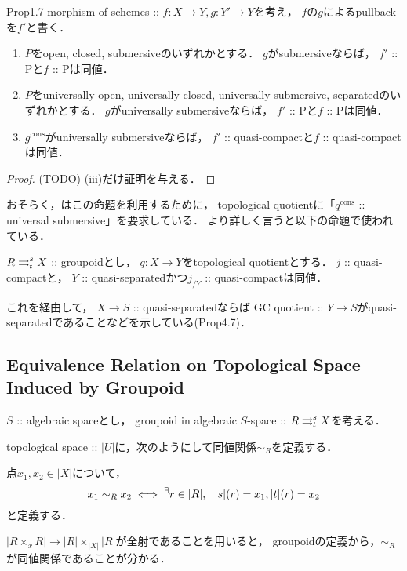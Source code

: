 \documentclass[a4paper, dvipdfmx]{jsarticle}
\newcommand{\cons}{\mathrm{cons}}
\begin{document}
\begin{Prop}{\cite{Rydh10} Prop1.7}
    morphism of schemes :: $f \colon X \to Y, g \colon Y' \to Y$を考え，
    $f$の$g$によるpullbackを$f'$と書く．
    \begin{enumerate}
    \item 
        $P$をopen, closed, submersiveのいずれかとする．
        $g$がsubmersiveならば，
        $f'$ :: Pと$f$ :: Pは同値．
    \item 
        $P$をuniversally open, universally closed, universally submersive, separatedのいずれかとする．
        $g$がuniversally submersiveならば，
        $f'$ :: Pと$f$ :: Pは同値．
    \item 
        $g^{\cons}$がuniversally submersiveならば，
        $f'$ :: quasi-compactと$f$ :: quasi-compactは同値．
    \end{enumerate}
\end{Prop}
\begin{proof}
    (TODO)
    (iii)だけ証明を与える．
\end{proof}

\begin{Remark}
    おそらく，\cite{Rydh13}はこの命題を利用するために，
    topological quotientに「$q^{\cons}$ :: universal submersive」を要求している．
    より詳しく言うと以下の命題で使われている．
    \begin{Prop}
        $R \mathrel{\mathop{\rightrightarrows}^{s}_{t}} X$ :: groupoidとし，
        $q \colon X \to Y$をtopological quotientとする．
        $j$ :: quasi-compactと，
        $Y$ :: quasi-separatedかつ$j_{/Y}$ :: quasi-compactは同値．
    \end{Prop}
    これを経由して，
    $X \to S$ :: quasi-separatedならば
    GC quotient :: $Y \to S$がquasi-separatedであることなどを示している(Prop4.7)．
\end{Remark}

\subsection{Equivalence Relation on Topological Space Induced by Groupoid}
$S$ :: algebraic spaceとし，
groupoid in algebraic $S$-space :: $R \mathrel{\mathop{\rightrightarrows}^{s}_{t}} X$を考える．

topological space :: $|U|$に，次のようにして同値関係$\sim_{R}$を定義する．
\begin{Def}
    点$x_1, x_2 \in |X|$について，
    \[ x_1 \sim_R x_2 \iff {}^{\exists} r \in |R|,~~ |s|(r)=x_1, |t|(r)=x_2 \]
    と定義する．
\end{Def}
$|R \times_{x} R| \to |R| \times_{|X|} |R|$が全射であることを用いると，
groupoidの定義から，$\sim_R$が同値関係であることが分かる．
\end{document}
